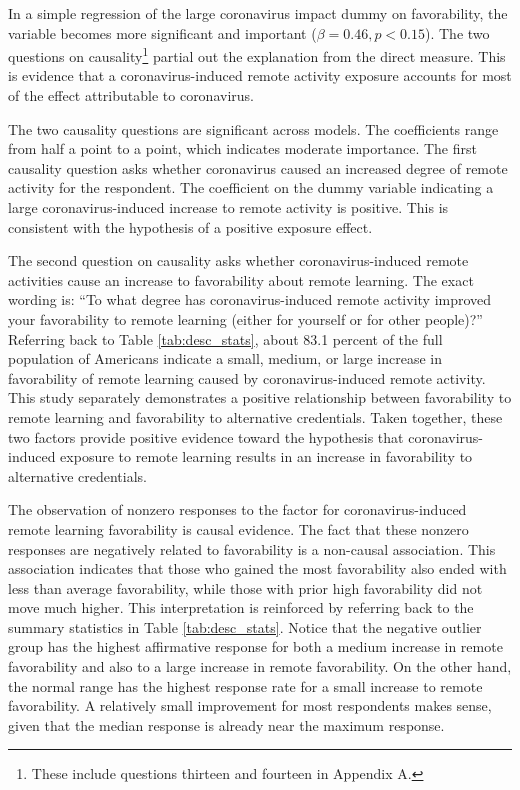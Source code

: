 \documentclass[review]{elsarticle}
\begin{document}
In a simple regression of the large coronavirus impact dummy on favorability,
the variable becomes more significant and important ($\beta = 0.46, p < 0.15$).
The two questions on causality\footnote{These include questions thirteen and fourteen in Appendix A.}
partial out the explanation from the direct measure.
This is evidence that a coronavirus-induced remote activity exposure accounts for most of the effect attributable to coronavirus.

The two causality questions are significant across models.
The coefficients range from half a point to a point, which indicates moderate importance.
The first causality question asks whether coronavirus caused an increased degree of remote activity for the respondent.
The coefficient on the dummy variable indicating a large coronavirus-induced increase to remote activity is positive.
This is consistent with the hypothesis of a positive exposure effect.

The second question on causality asks whether coronavirus-induced remote activities cause an increase
to favorability about remote learning.
The exact wording is:
``To what degree has coronavirus-induced remote activity improved your favorability to remote learning
(either for yourself or for other people)?''
Referring back to Table \ref{tab:desc_stats},
about 83.1 percent of the full population of Americans indicate a small,
medium, or large increase in favorability of remote learning
caused by coronavirus-induced remote activity.
This study separately demonstrates a positive relationship between favorability to remote learning
and favorability to alternative credentials.
Taken together,
these two factors provide positive evidence toward the hypothesis that coronavirus-induced exposure to remote learning
results in an increase in favorability to alternative credentials.

The observation of nonzero responses to the factor for coronavirus-induced remote learning favorability is causal evidence.
The fact that these nonzero responses are negatively related to favorability is a non-causal association.
This association indicates that those who gained the most favorability also ended with less than average favorability,
while those with prior high favorability did not move much higher.
This interpretation is reinforced by referring back to the summary statistics in Table \ref{tab:desc_stats}.
Notice that the negative outlier group has the highest affirmative response for both a
medium increase in remote favorability
and also to a large increase in remote favorability.
On the other hand, the normal range has the highest response rate for a small increase to remote favorability.
A relatively small improvement for most respondents makes sense,
given that the median response is already near the maximum response.
\end{document}
